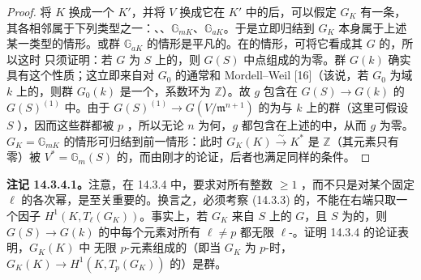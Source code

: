 \begin{proof}
将 $K$ 换成一个 $K'$，并将 $V$ 换成它在 $K'$ 中的后，可以假定 $G_K$ 有一条，其各相邻属于下列类型之一：、、$\mathbb G_{mK}$、$\mathbb G_{aK}$。于是立即归结到 $G_K$ 本身属于上述某一类型的情形。或群 $\mathbb G_{aK}$ 的情形是平凡的。在的情形，可将它看成其 $G$ 的，所以这时
只须证明：若 $G$ 为 $S$ 上的，则 $G(S)$ 中点组成的为零。群 $G(k)$ 确实具有这个性质；这立即来自对 $G_0$ 的通常和 Mordell--Weil  [16]（该说，若 $G_0$ 为域 $k$ 上的，则群 $G_0(k)$ 是一个，系数环为 $\mathbb Z$）。故 $g$ 包含在 $G(S)\to G(k)$ 的 $G(S)^{(1)}$ 中。由于 $G(S)^{(1)}\to G(V/\mathfrak m^{n+1})$ 的为与 $k$ 上的群（这里可假设 $S$ ），因而这些群都被 $p$ ，所以无论 $n$ 为何，$g$ 都包含在上述的中，从而 $g$ 为零。$G_K=\mathbb G_{mK}$ 的情形可归结到前一情形：此时 $G_K(K)\xrightarrow\sim K^*$ 是 $\mathbb Z$（其元素只有零）被 $V^*=\mathbb G_m(S)$ 的，而由刚才的论证，后者也满足同样的条件。
\end{proof}

\textbf{注记 14.3.4.1。}注意，在 14.3.4 中，要求对所有整数 $\geq1$ ，而不只是对某个固定 $\ell$ 的各次幂，是至关重要的。换言之，必须考察 (14.3.3) 的，不能在右端只取一个因子 $H^1(K,T_\ell(G_K))$。事实上，若 $G_K$ 来自 $S$ 上的 $G$，且 $S$ 为的，则 $G(S)\to G(k)$ 的中每个元素对所有 $\ell\ne p$ 都无限 $\ell$-。证明 14.3.4 的论证表明，$G_K(K)$ 中
无限 $p$-元素组成的（即当 $G_K$ 为 $p$-时，$G_K(K)\to H^1(K,T_p(G_K))$ 的）是群。

